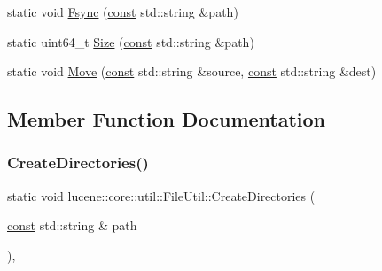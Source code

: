 \begin{DoxyCompactItemize}
\item 
static void \mbox{\hyperlink{classlucene_1_1core_1_1util_1_1FileUtil_a9d4a2709426e38e7051867c7b65aa5db}{Fsync}} (\mbox{\hyperlink{ZlibCrc32_8h_a2c212835823e3c54a8ab6d95c652660e}{const}} std\+::string \&path)
\item 
static uint64\+\_\+t \mbox{\hyperlink{classlucene_1_1core_1_1util_1_1FileUtil_ae1366f1b553b4c5d66159bda3d36b8b3}{Size}} (\mbox{\hyperlink{ZlibCrc32_8h_a2c212835823e3c54a8ab6d95c652660e}{const}} std\+::string \&path)
\item 
static void \mbox{\hyperlink{classlucene_1_1core_1_1util_1_1FileUtil_a2601e4b868caabbebca6656c5ee7f655}{Move}} (\mbox{\hyperlink{ZlibCrc32_8h_a2c212835823e3c54a8ab6d95c652660e}{const}} std\+::string \&source, \mbox{\hyperlink{ZlibCrc32_8h_a2c212835823e3c54a8ab6d95c652660e}{const}} std\+::string \&dest)
\end{DoxyCompactItemize}


\subsection{Member Function Documentation}
\mbox{\label{classlucene_1_1core_1_1util_1_1FileUtil_ab626b04521245beb0d5f031bcca6536d}} 
\subsubsection{\texorpdfstring{Create\+Directories()}{CreateDirectories()}}
{\footnotesize\ttfamily static void lucene\+::core\+::util\+::\+File\+Util\+::\+Create\+Directories (\begin{DoxyParamCaption}\item[{\mbox{\hyperlink{ZlibCrc32_8h_a2c212835823e3c54a8ab6d95c652660e}{const}} std\+::string \&}]{path }\end{DoxyParamCaption})\hspace{0.3cm}{\ttfamily [inline]}, {\ttfamily [static]}}

\mbox{\label{classlucene_1_1core_1_1util_1_1FileUtil_a93414b851dfb9d3e0cdabade88caca63}} 
